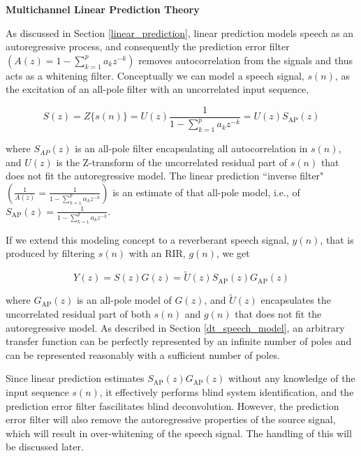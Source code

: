 \noindent
\textbf{Multichannel Linear Prediction Theory}

As discussed in Section \ref{linear_prediction}, linear prediction models speech as an autoregressive process, and consequently the prediction error filter $\left(A(z)=1-\sum_{k=1}^{p}a_k z^{-k}\right)$ removes autocorrelation from the signals and thus acts as a whitening filter. Conceptually we can model a speech signal, $s(n)$, as the excitation of an all-pole filter with an uncorrelated input sequence, 

\begin{equation}
	S(z)=Z\{s(n)\}=U(z) \frac{1}{1 - \sum_{k=1}^{p}a_k z^{-k}}  = U(z) S_{\mathrm{AP}}(z)
\end{equation}

\noindent
where $S_{AP}(z)$ is an all-pole filter encapsulating all autocorrelation in $s(n)$, and $U(z)$ is the Z-transform of the uncorrelated residual part of $s(n)$  that does not fit the autoregressive model. The linear prediction ``inverse filter" $\left(\frac{1}{A(z)} =\frac{1}{1 - \sum_{k=1}^{p}\alpha_k z^{-k}}\right)$  is an estimate of that all-pole model, i.e., of $S_{\mathrm{AP}}(z) = \frac{1}{1 - \sum_{k=1}^{p}a_k z^{-k}}$. 

If we extend this modeling concept to a reverberant speech signal, $y(n)$, that is produced by filtering $s(n)$ with an RIR, $g(n)$, we get

\begin{equation}
	Y(z) = S(z) G(z) = \tilde{U}(z) S_{\mathrm{AP}}(z) G_{\mathrm{AP}}(z)
\end{equation}


\noindent
where $G_{\mathrm{AP}}(z)$ is an all-pole model of $G(z)$, and $\tilde{U}(z)$ encapsulates the uncorrelated residual part of both $s(n)$  and $g(n)$ that does not fit the autoregressive model. As described in Section \ref{dt_speech_model}, an arbitrary transfer function can be perfectly represented by an infinite number of poles and can be represented reasonably with a sufficient number of poles.

Since linear prediction estimates $S_{\mathrm{AP}}(z)G_{\mathrm{AP}}(z)$ without any knowledge of the input sequence $s(n)$, it effectively performs blind system identification, and the prediction error filter fascilitates blind deconvolution. However, the prediction error filter will also remove the autoregressive properties of the source signal, which will result in over-whitening of the speech signal. The handling of this will be discussed later.

